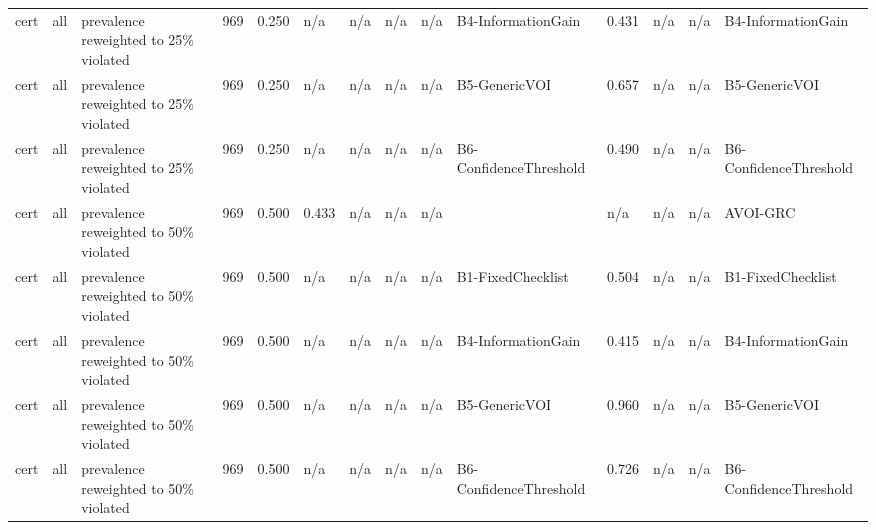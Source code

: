 \begin{table}[!ht]
{\begin{tabular}{llllllllllllll}
cert & all & prevalence reweighted to 25\% violated & 969 & 0.250 & n/a & n/a & n/a & n/a & B4-InformationGain & 0.431 & n/a & n/a & B4-InformationGain \\
cert & all & prevalence reweighted to 25\% violated & 969 & 0.250 & n/a & n/a & n/a & n/a & B5-GenericVOI & 0.657 & n/a & n/a & B5-GenericVOI \\
cert & all & prevalence reweighted to 25\% violated & 969 & 0.250 & n/a & n/a & n/a & n/a & B6-ConfidenceThreshold & 0.490 & n/a & n/a & B6-ConfidenceThreshold \\
cert & all & prevalence reweighted to 50\% violated & 969 & 0.500 & 0.433 & n/a & n/a & n/a &  & n/a & n/a & n/a & AVOI-GRC \\
cert & all & prevalence reweighted to 50\% violated & 969 & 0.500 & n/a & n/a & n/a & n/a & B1-FixedChecklist & 0.504 & n/a & n/a & B1-FixedChecklist \\
cert & all & prevalence reweighted to 50\% violated & 969 & 0.500 & n/a & n/a & n/a & n/a & B4-InformationGain & 0.415 & n/a & n/a & B4-InformationGain \\
cert & all & prevalence reweighted to 50\% violated & 969 & 0.500 & n/a & n/a & n/a & n/a & B5-GenericVOI & 0.960 & n/a & n/a & B5-GenericVOI \\
cert & all & prevalence reweighted to 50\% violated & 969 & 0.500 & n/a & n/a & n/a & n/a & B6-ConfidenceThreshold & 0.726 & n/a & n/a & B6-ConfidenceThreshold \\
\bottomrule
\end{tabular}}
\end{table}
